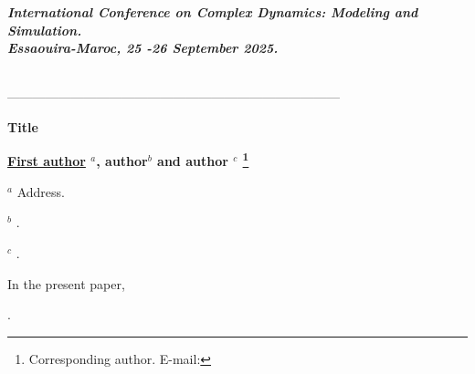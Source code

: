 \documentclass [12pt]{article}
\numberwithin{equation}{section}
\begin{document}
\begin{center}
\footnotesize {

\textit{\textbf{International Conference on Complex Dynamics: Modeling and Simulation.\\ Essaouira-Maroc, 25 -26 September 2025.}}
}\\
------------------------------------------------------------------------------
\end{center}
\thispagestyle{plain}

\vspace*{2cm} \normalsize \centerline{\Large \bf Title}

\vspace*{1cm}

\centerline{\bf \underline{First author} $^a$, author$^b$ and author $^c$
 \footnote{Corresponding author. E-mail: }}
\vspace*{0.5cm}

\centerline{$^a$ Address.}

\centerline{$^b$ .}

\centerline{$^c$ .}




\vspace*{1cm}

    In the present paper,

\vspace*{0.5cm}

.
\end{document}
